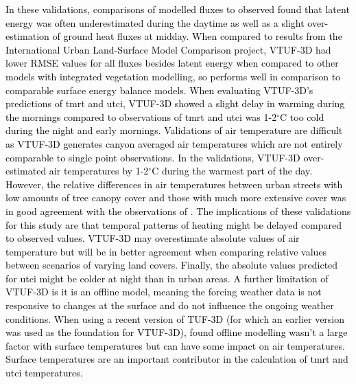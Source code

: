 \documentclass[final,3p,times,authoryear]{elsarticle}
\newcommand{\add}[1]{\textcolor{black}{#1}}
\begin{document}
\add{In these validations, comparisons of modelled fluxes to observed found that latent energy was often underestimated during the daytime as well as a slight over-estimation of ground heat fluxes at midday. When compared to results from the \cite{Best2012} International Urban Land-Surface Model Comparison project, VTUF-3D had lower RMSE values for all fluxes besides latent energy when compared to other models with integrated vegetation modelling, so performs well in comparison to comparable surface energy balance models. When evaluating VTUF-3D's predictions of \gls{tmrt} and \gls{utci}, VTUF-3D showed a slight delay in warming during the mornings compared to observations of \gls{tmrt} and \gls{utci} was 1-2$^{\circ}$C too cold during the night and early mornings. Validations of air temperature are difficult as VTUF-3D generates canyon averaged air temperatures which are not entirely comparable to single point observations. In the validations, VTUF-3D over-estimated air temperatures by 1-2$^{\circ}$C during the warmest part of the day. However, the relative differences in air temperatures between urban streets with low amounts of tree canopy cover and those with much more extensive cover was in good agreement with the observations of \cite{Coutts2015}. The implications of these validations for this study are that temporal patterns of heating might be delayed compared to observed values. VTUF-3D may overestimate absolute values of air temperature but will be in better agreement when comparing relative values between scenarios of varying land covers. Finally, the absolute values predicted for \gls{utci} might be colder at night than in urban areas. A further limitation of VTUF-3D is it is an offline model, meaning the forcing weather data is not responsive to changes at the surface and do not influence the ongoing weather conditions. When using a recent version of TUF-3D (for which an earlier version was used as the foundation for VTUF-3D), \cite{Stewart2021} found offline modelling wasn't a large factor with surface temperatures but can have some impact on air temperatures. Surface temperatures are an important contributor in the calculation of \gls{tmrt} and \gls{utci} temperatures.}
\end{document}
